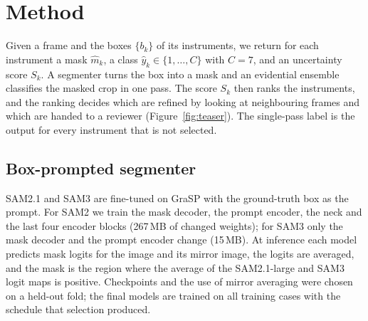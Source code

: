 \section{Method}
\label{sec:method}

Given a frame and the boxes $\{b_k\}$ of its instruments, we return for each instrument a mask $\hat{m}_k$, a class $\hat{y}_k \in \{1,\dots,C\}$ with $C=7$, and an uncertainty score $S_k$.
A segmenter turns the box into a mask and an evidential ensemble classifies the masked crop in one pass.
The score $S_k$ then ranks the instruments, and the ranking decides which are refined by looking at neighbouring frames and which are handed to a reviewer (Figure~\ref{fig:teaser}).
The single-pass label is the output for every instrument that is not selected.

\subsection{Box-prompted segmenter}
SAM2.1 and SAM3 are fine-tuned on GraSP with the ground-truth box as the prompt.
For SAM2 we train the mask decoder, the prompt encoder, the neck and the last four encoder blocks (267\,MB of changed weights); for SAM3 only the mask decoder and the prompt encoder change (15\,MB).
At inference each model predicts mask logits for the image and its mirror image, the logits are averaged, and the mask is the region where the average of the SAM2.1-large and SAM3 logit maps is positive.
Checkpoints and the use of mirror averaging were chosen on a held-out fold; the final models are trained on all training cases with the schedule that selection produced.

